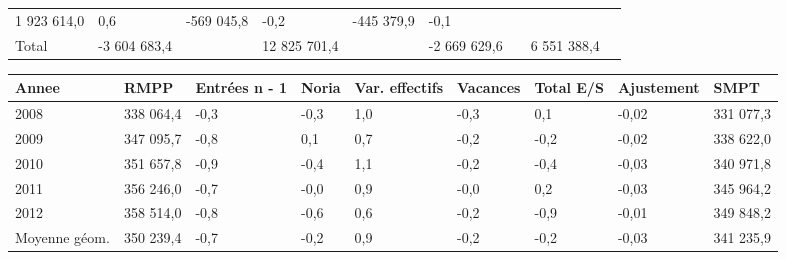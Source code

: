\begin{longtable}[]{@{}lllllllll@{}}
\begin{minipage}[t]{0.16\columnwidth}
1 923 614,0\strut
\end{minipage} & \begin{minipage}[t]{0.06\columnwidth}\raggedright
0,6\strut
\end{minipage} & \begin{minipage}[t]{0.12\columnwidth}\raggedright
-569 045,8\strut
\end{minipage} & \begin{minipage}[t]{0.06\columnwidth}\raggedright
-0,2\strut
\end{minipage} & \begin{minipage}[t]{0.10\columnwidth}\raggedright
-445 379,9\strut
\end{minipage} & \begin{minipage}[t]{0.06\columnwidth}\raggedright
-0,1\strut
\end{minipage}\tabularnewline
\begin{minipage}[t]{0.05\columnwidth}\raggedright
Total\strut
\end{minipage} & \begin{minipage}[t]{0.10\columnwidth}\raggedright
-3 604 683,4\strut
\end{minipage} & \begin{minipage}[t]{0.06\columnwidth}\raggedright
\strut
\end{minipage} & \begin{minipage}[t]{0.16\columnwidth}\raggedright
12 825 701,4\strut
\end{minipage} & \begin{minipage}[t]{0.06\columnwidth}\raggedright
\strut
\end{minipage} & \begin{minipage}[t]{0.12\columnwidth}\raggedright
-2 669 629,6\strut
\end{minipage} & \begin{minipage}[t]{0.06\columnwidth}\raggedright
\strut
\end{minipage} & \begin{minipage}[t]{0.10\columnwidth}\raggedright
6 551 388,4\strut
\end{minipage} & \begin{minipage}[t]{0.06\columnwidth}\raggedright
\strut
\end{minipage}\tabularnewline
\bottomrule
\end{longtable}

\begin{longtable}[]{@{}lllllllll@{}}
\toprule
Annee & RMPP & Entrées n - 1 & Noria & Var. effectifs & Vacances & Total
E/S & Ajustement & SMPT\tabularnewline
\midrule
\endhead
2008 & 338 064,4 & -0,3 & -0,3 & 1,0 & -0,3 & 0,1 & -0,02 & 331
077,3\tabularnewline
2009 & 347 095,7 & -0,8 & 0,1 & 0,7 & -0,2 & -0,2 & -0,02 & 338
622,0\tabularnewline
2010 & 351 657,8 & -0,9 & -0,4 & 1,1 & -0,2 & -0,4 & -0,03 & 340
971,8\tabularnewline
2011 & 356 246,0 & -0,7 & -0,0 & 0,9 & -0,0 & 0,2 & -0,03 & 345
964,2\tabularnewline
2012 & 358 514,0 & -0,8 & -0,6 & 0,6 & -0,2 & -0,9 & -0,01 & 349
848,2\tabularnewline
Moyenne géom. & 350 239,4 & -0,7 & -0,2 & 0,9 & -0,2 & -0,2 & -0,03 &
341 235,9\tabularnewline
\bottomrule
\end{longtable}


